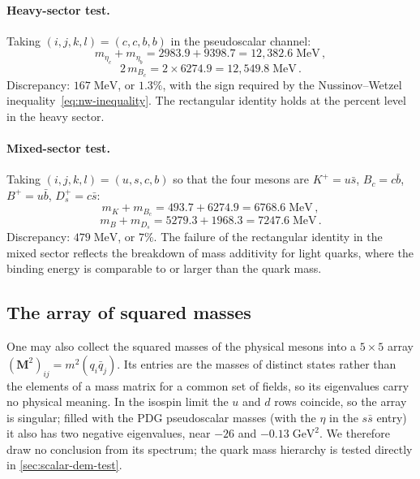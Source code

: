 \documentclass[11pt,a4paper]{article}
\theoremstyle{plain}
\begin{document}
\paragraph{Heavy-sector test.}
Taking $(i,j,k,l) = (c,c,b,b)$ in the pseudoscalar channel:
\begin{equation}
  m_{\eta_c} + m_{\eta_b} = 2983.9 + 9398.7 = 12{,}382.6\;\text{MeV}\,,
\end{equation}
\begin{equation}
  2\,m_{B_c} = 2 \times 6274.9 = 12{,}549.8\;\text{MeV}\,.
\end{equation}
Discrepancy: $167\;\text{MeV}$, or $1.3\%$, with the sign required by
the Nussinov--Wetzel inequality~\eqref{eq:nw-inequality}.  The
rectangular identity holds at the percent level in the heavy sector.

\paragraph{Mixed-sector test.}
Taking $(i,j,k,l) = (u,s,c,b)$ so that the four mesons are
$K^+ = u\bar{s}$, $B_c = c\bar{b}$, $B^+ = u\bar{b}$,
$D_s^+ = c\bar{s}$:
\begin{equation}
  m_{K} + m_{B_c} = 493.7 + 6274.9 = 6768.6\;\text{MeV}\,,
\end{equation}
\begin{equation}
  m_{B} + m_{D_s} = 5279.3 + 1968.3 = 7247.6\;\text{MeV}\,.
\end{equation}
Discrepancy: $479\;\text{MeV}$, or $7\%$.  The failure of the
rectangular identity in the mixed sector reflects the breakdown of
mass additivity for light quarks, where the binding energy is
comparable to or larger than the quark mass.

\subsection{The array of squared masses}

One may also collect the squared masses of the physical mesons into a
$5 \times 5$ array $(\mathbf{M}^2)_{ij} = m^2(q_i\bar{q}_j)$.  Its
entries are the masses of distinct states rather than the elements of
a mass matrix for a common set of fields, so its eigenvalues carry no
physical meaning.  In the isospin limit the $u$ and $d$ rows coincide,
so the array is singular; filled with the PDG pseudoscalar masses (with
the $\eta$ in the $s\bar{s}$ entry) it also has two negative
eigenvalues, near $-26$ and $-0.13\;\text{GeV}^2$.  We therefore draw
no conclusion from its spectrum; the quark mass hierarchy is tested
directly in \cref{sec:scalar-dem-test}.
\end{document}
